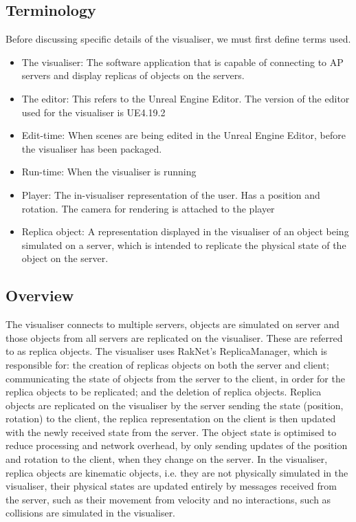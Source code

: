 \subsection{Terminology}
Before discussing specific details of the visualiser, we must first define terms used.
\begin{itemize}
	\item The visualiser: The software application that is capable of connecting to AP servers and display replicas of objects on the servers.
	\item The editor: This refers to the Unreal Engine Editor. The version of the editor used for the visualiser is UE4.19.2
	\item Edit-time: When scenes are being edited in the Unreal Engine Editor, before the visualiser has been packaged.
	\item Run-time: When the visualiser is running
	\item Player: The in-visualiser representation of the user. Has a position and rotation. The camera for rendering is attached to the player
	\item Replica object: A representation displayed in the visualiser of an object being simulated on a server, which is intended to replicate the physical state of the object on the server.
\end{itemize}

\subsection{Overview}
The visualiser connects to multiple servers, objects are simulated on server and those objects from all servers are replicated on the visualiser. These are referred to as replica objects. The visualiser uses RakNet's ReplicaManager, which is responsible for: the creation of replicas objects on both the server and client; communicating the state of objects from the server to the client, in order for the replica objects to be replicated; and the deletion of replica objects. Replica objects are replicated on the visualiser by the server sending the state (position, rotation) to the client, the replica representation on the client is then updated with the newly received state from the server. The object state is optimised to reduce processing and network overhead, by only sending updates of the position and rotation to the client, when they change on the server. In the visualiser, replica objects are kinematic objects, i.e. they are not physically simulated in the visualiser, their physical states are updated entirely by messages received from the server, such as their movement from velocity and no interactions, such as collisions are simulated in the visualiser.

